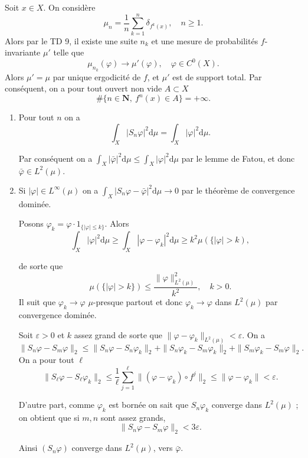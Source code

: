 \documentclass[a4paper,12pt,openany]{article}
\theoremstyle{plain}
\theoremstyle{definition}
\newcommand{\dd}{\mathrm{d}}
\newcommand{\N}{\mathbf{N}}
\begin{document}

\noindent
Soit $x \in X.$ On consid\`ere 
$$
\mu_n = \frac{1}{n} \sum_{k=1}^n \delta_{f^k(x)}, \quad n \geqslant 1.
$$
Alors par le TD 9, il existe une suite $n_k$ et une mesure de probabilit\'es $f$-invariante $\mu'$ telle que 
$$
\mu_{n_k}(\varphi) \to \mu'(\varphi), \quad \varphi \in C^0(X).
$$
Alors $\mu' = \mu$ par unique ergodicit\'e de $f$, et $\mu'$ est de support total. Par cons\'equent, on a pour tout ouvert non vide $A \subset X$ 
$$
\#\{n \in \N,~f^n(x) \in A\} = +\infty.
$$


\vspace{0.6cm}

 \vspace{1.5mm} 

\begin{enumerate}
\item Pour tout $n$ on a 
$$
\int_X |S_n \varphi|^2 \dd \mu = \int_X |\varphi|^2 \dd \mu.
$$

Par cons\'equent on a $\int_X |\bar \varphi|^2 \dd \mu \leqslant \int_X |\varphi|^2 \dd \mu$ par le lemme de Fatou, et donc $\bar \varphi \in L^2(\mu).$ 
\item Si $|\varphi| \in L^\infty(\mu)$ on a $\int_X |S_n \varphi - \bar \varphi|^2 \dd \mu \to 0$ par le th\'eor\`eme de convergence domin\'ee.

Posons $\varphi_k = \varphi \cdot1_{\{|\varphi|\leqslant k\}}.$ Alors 
$$
\int_X |\varphi|^2 \dd \mu \geqslant \int_X |\varphi - \varphi_k|^2 \dd \mu \geqslant k^2 \mu(\{|\varphi| > k),
$$

de sorte que 
$$
\mu(\{|\varphi|> k\}) \leqslant \frac{\|\varphi\|_{L^2(\mu)}^2}{k^2}, \quad k > 0.
$$
 Il suit que $\varphi_k \to \varphi$ $\mu$-presque partout et donc $\varphi_k \to \varphi$ dans $L^2(\mu)$ par convergence domin\'ee.



Soit $\varepsilon > 0$ et $k$ assez grand de sorte que $\|\varphi-\varphi_k\|_{L^2(\mu)} < \varepsilon.$  On a 
$$
\|S_n\varphi - S_m\varphi\|_{2} \leqslant\|S_n\varphi - S_n\varphi_k\|_2 + \|S_n \varphi_k - S_m \varphi_k\|_2 + \|S_m \varphi_k - S_m \varphi\|_2.
$$
On a pour tout $\ell$
$$
\|S_\ell \varphi - S_\ell \varphi_k\|_2 \leqslant \frac{1}{\ell} \sum_{j=1}^\ell \|(\varphi - \varphi_k) \circ f^j\|_2 \leqslant \|\varphi - \varphi_k\| < \varepsilon.
$$

D'autre part, comme $\varphi_k$ est born\'ee on sait que $S_n \varphi_k$ converge dans $L^2(\mu)$ ; on obtient que si $m,n$ sont assez grands, 
$$
\|S_n \varphi - S_m \varphi\|_2 < 3 \varepsilon.
$$

Ainsi $(S_n \varphi)$ converge dans $L^2(\mu)$, vers $\bar \varphi.$
\end{enumerate}
\vspace{0.6cm}
\end{document}
